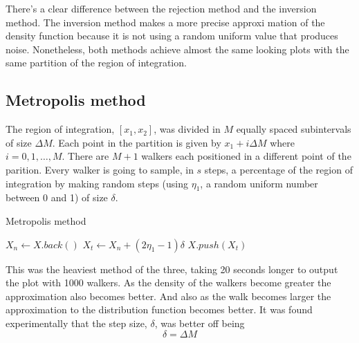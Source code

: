\documentclass[11pt]{article}
\begin{document}
There's a clear difference between the rejection method and the inversion method. The inversion method makes a more precise approxi mation of the density function because it is not using a random uniform value that produces noise. Nonetheless, both methods achieve almost the same looking plots with the same partition of the region of integration.

\subsection{Metropolis method}

The region of integration, $[x_1,x_2]$, was divided in $M$ equally spaced subintervals of size $\Delta M$. Each point in the partition is given by $x_1 + i \Delta M$ where $i=0,1,\dots,M$. There are $M+1$ walkers each positioned in a different point of the parition. Every walker is going to sample, in $s$ steps, a percentage of the region of integration by making random steps (using $\eta_1$, a random uniform number between 0 and 1) of size $\delta$.

\begin{algorithm}
 \caption{Metropolis method} 
 \label{metropolisAlgorithm}
 \begin{algorithmic}[1]
 \State $X_n\leftarrow X.back()$ 
 \State $X_t\leftarrow X_n + (2\eta_1 - 1)\delta$
 \State $X.push(X_t)$

 \EndIf
 \EndFor
 \EndFor
 \end{algorithmic}
\end{algorithm}

This was the heaviest method of the three, taking 20 seconds longer to output the plot with 1000 walkers. As the density of the walkers become greater the approximation also becomes better. And also as the walk becomes larger the approximation to the distribution function becomes better. It was found experimentally that the step size, $\delta$, was better off being
\begin{equation*}
  \delta = \Delta M
\end{equation*}
\end{document}
